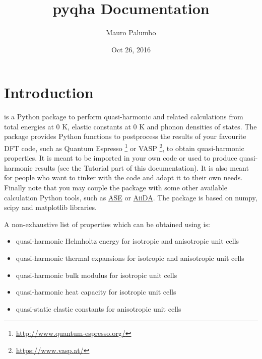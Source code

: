 \documentclass[letterpaper,10pt,english]{sphinxmanual}
\title{pyqha Documentation}
\date{Oct 26, 2016}
\author{Mauro Palumbo}
\begin{document}
\maketitle
\tableofcontents
{}\label{index::doc}



\chapter{Introduction}
\label{introduction:introduction}\label{introduction:welcome-to-pyqha-s-documentation}\label{introduction::doc}\label{introduction:id1}
 is a Python package to perform quasi-harmonic and related calculations from total energies at 0 K, elastic constants at 0 K and phonon densities of states. The package provides Python functions to postprocess the results of your favourite DFT code, such as Quantum Espresso \footnote[1]{\sphinxAtStartFootnote
\url{http://www.quantum-espresso.org/}
} or VASP \footnote[2]{\sphinxAtStartFootnote
\url{https://www.vasp.at/}
}, to obtain quasi-harmonic properties. It is meant to be imported in your own code or used to produce quasi-harmonic results (see the Tutorial part of this documentation). It is also meant for people who want to tinker with the code and adapt it to their own needs. Finally note that you may couple the package with some other available calculation Python tools, such as \href{https://wiki.fysik.dtu.dk/ase/about.html}{ASE} or \href{http://www.aiida.net/}{AiiDA}.
The package is based on numpy, scipy and matplotlib libraries.

A non-exhaustive list of properties which can be obtained using  is:
\begin{itemize}
\item {} 
quasi-harmonic Helmholtz energy for isotropic and anisotropic unit cells

\item {} 
quasi-harmonic thermal expansions for isotropic and anisotropic unit cells

\item {} 
quasi-harmonic bulk modulus for isotropic unit cells

\item {} 
quasi-harmonic heat capacity for isotropic unit cells

\item {} 
quasi-static elastic constants for anisotropic unit cells

\end{itemize}
\end{document}
